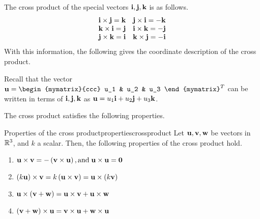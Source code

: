 The cross product of the special vectors ${\bf i}, {\bf j},
{\bf k}$ is as follows.  
\begin{equation*}
\begin{array}{cc}
{\bf i}\times {\bf j}={\bf k} & {\bf j}\times {\bf i}=-{\bf k} \\
{\bf k}\times {\bf i}={\bf j} & {\bf i}\times {\bf k}=-{\bf j} \\
{\bf j}\times {\bf k}={\bf i} & {\bf k}\times {\bf j}=-{\bf i}
\end{array}
\end{equation*}
With this information, the following gives the coordinate description of the
cross product.

Recall that the vector $\vect{u}= \begin{mymatrix}{ccc}
u_1 & u_2 & u_3
\end{mymatrix}^T$
can be written in terms of ${\bf i}, {\bf j}, {\bf k}$ as ${\bf u}=u_{1}{\bf i}+u_{2}{\bf j}+u_{3}{\bf k}$. 

The cross product satisfies the following properties.

\begin{proposition}{Properties of the cross product}{propertiescrossproduct}
Let ${\bf u}, {\bf v}, {\bf w}$ be vectors in $\mathbb{R}^3$, and $k$ a scalar. Then, the following properties 
of the cross product hold.
\begin{enumerate}
\item 
${\bf u}\times {\bf v}= -\left( {\bf v}\times {\bf u}\right), 
\mbox{and} \; {\bf u}\times {\bf u}={\bf 0}$
\item 
$\left( k {\bf u}\right)\times {\bf v}= k \left( {\bf u}\times {\bf v}\right) 
={\bf u}\times \left( k {\bf v}\right)$
\item
${\bf u}\times \left( {\bf v}+{\bf w}\right) ={\bf u}\times {\bf v}+{\bf u}\times {\bf w}$
\item 
$\left( {\bf v}+{\bf w}\right) \times {\bf u}={\bf v} \times {\bf u}+{\bf w}\times {\bf u}$
\end{enumerate}
\end{proposition}

